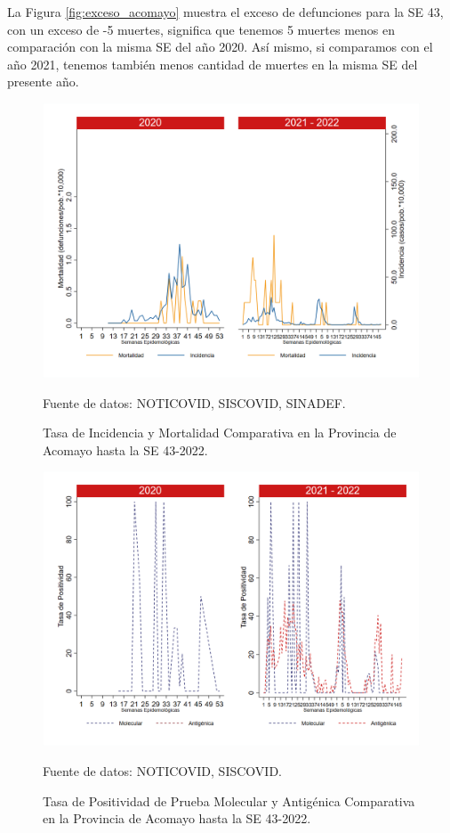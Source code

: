 \documentclass[12pt,a4paper,openany]{book}
\begin{document}
	La Figura \ref{fig:exceso_acomayo} muestra el exceso de defunciones para la SE 43, con un exceso de -5 muertes, significa que tenemos 5 muertes menos en comparación con la misma SE del año 2020. Así mismo, si comparamos con el año 2021, tenemos también menos cantidad de muertes en la misma SE del presente año.
	\begin{figure}[h]
		\caption{Tasa de Incidencia y Mortalidad Comparativa en la Provincia de Acomayo hasta la SE 43-2022.}\label{fig:inc_mort_acomayo}
		\begin{center}
			\includegraphics[width=0.70\linewidth]{../figuras/incidencia_mortalidad_20_21_1.png}
		\end{center}
		{\footnotesize {Fuente de datos: NOTICOVID, SISCOVID, SINADEF.}}
	\end{figure}
	
	\begin{figure}[h]
		\caption{Tasa de Positividad de Prueba Molecular y Antigénica Comparativa en la Provincia de Acomayo hasta la SE 43-2022. }\label{fig:positividad_acomayo}
		\begin{center}
			\includegraphics[width=0.7\linewidth]{../figuras/positividad_20_21_1.png}
		\end{center}
		{\footnotesize {Fuente de datos: NOTICOVID, SISCOVID.}}
	\end{figure}
	
\end{document}
